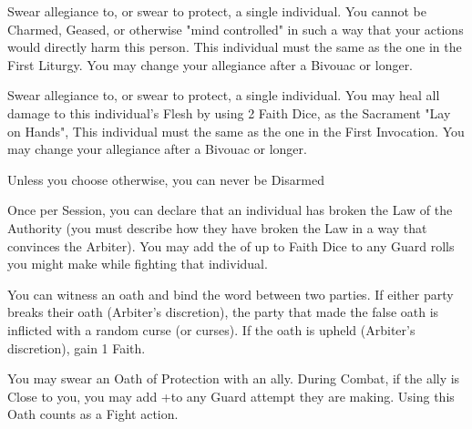 {

Swear allegiance to, or swear to protect, a single individual.  You cannot be Charmed, Geased, or otherwise "mind controlled" in such a way that your actions would directly harm this person.  This individual must the same as the one in the First Liturgy.  You may change your allegiance after a Bivouac or longer.


Swear allegiance to, or swear to protect, a single individual.  You may heal all damage to this individual's Flesh by using 2 Faith Dice, as the Sacrament "Lay on Hands",  This individual must the same as the one in the First Invocation.  You may change your allegiance after a Bivouac or longer.




\GOD[
Name=Týr,
Link=small-god-týr,
GodOf=Seraph of Order,
Holy=an iron sleeve worn over the non-dominant hand (the hand is unable to hold anything)
]


Unless you choose otherwise, you can never be Disarmed


Once per Session, you can declare that an individual has broken the Law of the Authority (you must describe how they have broken the Law in a way that convinces the Arbiter).  You may add the \SUMDICE of up to \LVL Faith Dice to any Guard rolls you might make while fighting that individual.






\GOD[
Name=Vár,
Link=small-god-vár,
GodOf=Seraph of Oaths and Agreements,
Holy=a crystal vial containing the blood and spit of two Mortals who have struck a deal with one another
]


You can witness an oath and bind the word between two parties.  If either party breaks their oath (Arbiter's discretion), the party that made the false oath is inflicted with a random curse (or curses).  If the oath is upheld (Arbiter's discretion), gain 1 Faith.


You may swear an Oath of Protection with an ally. During Combat, if the ally is Close to you, you may add +\SUMDICE to any Guard \RO attempt they are making. Using this Oath counts as a Fight action.

}
